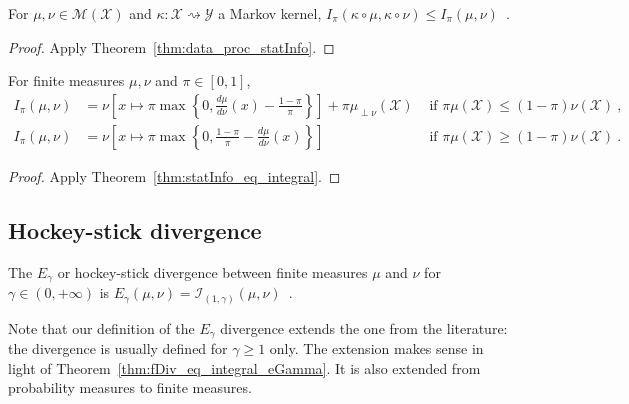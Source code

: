 \begin{theorem}
  \label{thm:data_proc_deGrootInfo}
  \leanok
  For $\mu, \nu \in \mathcal M(\mathcal X)$ and $\kappa : \mathcal X \rightsquigarrow \mathcal Y$ a Markov kernel, $I_\pi(\kappa \circ \mu, \kappa \circ \nu) \le I_\pi(\mu, \nu)$~.
\end{theorem}

\begin{proof}\leanok
{}
Apply Theorem~\ref{thm:data_proc_statInfo}.
\end{proof}


\begin{lemma}
  \label{lem:deGrootInfo_eq_integral}
  For finite measures $\mu, \nu$ and $\pi \in [0,1]$,
  \begin{align*}
  I_\pi(\mu, \nu)
  &= \nu\left[ x \mapsto \pi \max \left\{0 , \frac{d \mu}{d\nu}(x) - \frac{1 - \pi}{\pi} \right\} \right] + \pi \mu_{\perp \nu}(\mathcal X) & \text{ if } \pi \mu(\mathcal X) \le (1 - \pi) \nu(\mathcal X)
  \: , \\
  I_\pi(\mu, \nu)
  &= \nu\left[ x \mapsto \pi \max \left\{0 , \frac{1 - \pi}{\pi} - \frac{d \mu}{d\nu}(x) \right\} \right] & \text{ if } \pi \mu(\mathcal X) \ge (1 - \pi) \nu(\mathcal X)
  \: .
  \end{align*}
\end{lemma}

\begin{proof}%
{}
Apply Theorem~\ref{thm:statInfo_eq_integral}.
\end{proof}




\subsection{Hockey-stick divergence}


\begin{definition}
  \label{def:eGamma}
  \leanok
  The $E_\gamma$ or hockey-stick divergence between finite measures $\mu$ and $\nu$ for $\gamma \in (0,+\infty)$ is $E_\gamma(\mu, \nu) = \mathcal I_{(1,\gamma)}(\mu, \nu)$~.
\end{definition}

Note that our definition of the $E_\gamma$ divergence extends the one from the literature: the divergence is usually defined for $\gamma \ge 1$ only.
The extension makes sense in light of Theorem~\ref{thm:fDiv_eq_integral_eGamma}.
It is also extended from probability measures to finite measures.

